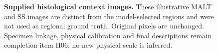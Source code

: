 \begin{figure}[p]\centering
{}
\caption{\textbf{Supplied histological context images.} These illustrative MALT and SS images are distinct from the model-selected regions and were not used as regional ground truth. Original pixels are unchanged. Specimen linkage, physical calibration and final descriptions remain completion item H06; no new physical scale is inferred.}
\end{figure}
